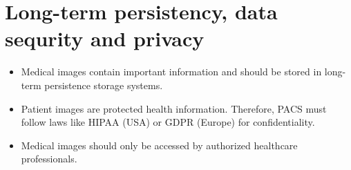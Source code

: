 \section{Long-term persistency, data sequrity and privacy}
\begin{itemize}
\item Medical images contain important information and should be
  stored in long-term persistence storage systems.
\item Patient images are protected health information. Therefore,
  \gls{PACS} must follow laws like HIPAA (USA) or GDPR (Europe) for
  confidentiality.
\item Medical images should only be accessed by authorized healthcare
  professionals.
\end{itemize}